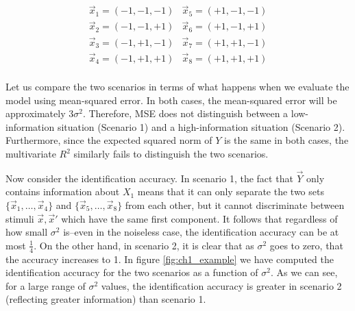 \[
\begin{matrix}
\vec{x}_1 = (-1, -1, -1) &
\vec{x}_5 = (+1, -1, -1) \\
\vec{x}_2 = (-1, -1, +1) &
\vec{x}_6 = (+1, -1, +1) \\
\vec{x}_3 = (-1, +1, -1) &
\vec{x}_7 = (+1, +1, -1) \\
\vec{x}_4 = (-1, +1, +1) & 
\vec{x}_8 = (+1, +1, +1) \\
\end{matrix}
\]

Let us compare the two scenarios in terms of what happens when we
evaluate the model using mean-squared error.  In both cases, the
mean-squared error will be approximately $3\sigma^2$.  Therefore, MSE
does not distinguish between a low-information situation (Scenario 1)
and a high-information situation (Scenario 2).  Furthermore, since the
expected squared norm of $Y$ is the same in both cases, the
multivariate $R^2$ similarly fails to distinguish the two scenarios.

Now consider the identification accuracy.  In scenario 1, the fact
that $\vec{Y}$ only contains information about $X_1$ means that it can
only separate the two sets $\{\vec{x}_1,\hdots, \vec{x}_4\}$ and
$\{\vec{x}_5,\hdots, \vec{x}_8\}$ from each other, but it cannot
discriminate between stimuli $\vec{x}, \vec{x}'$ which have the same
first component.  It follows that regardless of how small $\sigma^2$
is--even in the noiseless case, the identification accuracy can be at
most $\frac{1}{4}$.  On the other hand, in scenario 2, it is clear
that as $\sigma^2$ goes to zero, that the accuracy increases to 1.  In
figure \ref{fig:ch1_example} we have computed the identification
accuracy for the two scenarios as a function of $\sigma^2$.  As we can
see, for a large range of $\sigma^2$ values, the identification
accuracy is greater in scenario 2 (reflecting greater information)
than scenario 1.

